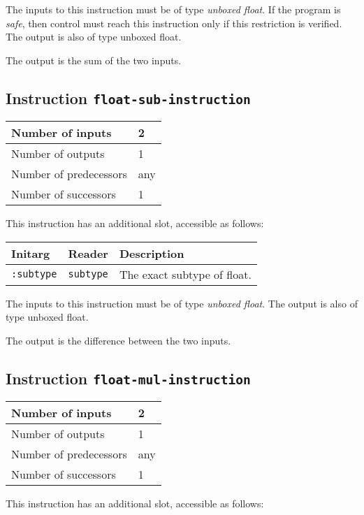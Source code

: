 The inputs to this instruction must be of type \emph{unboxed
  float}.  If the program is \emph{safe}, then control must reach this
instruction only if this restriction is verified.  The output is also
of type unboxed float.

The output is the sum of the two inputs.

\subsection{Instruction \texttt{float-sub-instruction}}
\label{hir-instruction-float-sub}

\begin{tabular}{|l|l|}
\hline
Number of inputs & 2\\
\hline
Number of outputs & 1\\
\hline
Number of predecessors & any\\
\hline
Number of successors & 1\\
\hline
\end{tabular}

This instruction has an additional slot, accessible as follows:

\begin{tabular}{|l|l|l|}
  \hline
  Initarg & Reader & Description\\
  \hline\hline
  \texttt{:subtype} & \texttt{subtype} & The exact subtype of float.\\
  \hline
\end{tabular}

The inputs to this instruction must be of type \emph{unboxed
  float}. The output is also of type unboxed float.

The output is the difference between the two inputs.

\subsection{Instruction \texttt{float-mul-instruction}}
\label{hir-instruction-float-mul}

\begin{tabular}{|l|l|}
\hline
Number of inputs & 2\\
\hline
Number of outputs & 1\\
\hline
Number of predecessors & any\\
\hline
Number of successors & 1\\
\hline
\end{tabular}

This instruction has an additional slot, accessible as follows:


